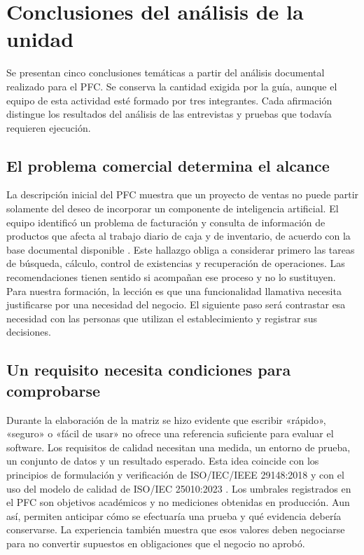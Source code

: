 \section{Conclusiones del análisis de la unidad}
Se presentan cinco conclusiones temáticas a partir del análisis documental realizado para el PFC. Se conserva la cantidad exigida por la guía, aunque el equipo de esta actividad esté formado por tres integrantes. Cada afirmación distingue los resultados del análisis de las entrevistas y pruebas que todavía requieren ejecución.

\subsection{El problema comercial determina el alcance}
La descripción inicial del PFC muestra que un proyecto de ventas no puede partir solamente del deseo de incorporar un componente de inteligencia artificial. El equipo identificó un problema de facturación y consulta de información de productos que afecta al trabajo diario de caja y de inventario, de acuerdo con la base documental disponible \cite{basePFC2026}. Este hallazgo obliga a considerar primero las tareas de búsqueda, cálculo, control de existencias y recuperación de operaciones. Las recomendaciones tienen sentido si acompañan ese proceso y no lo sustituyen. Para nuestra formación, la lección es que una funcionalidad llamativa necesita justificarse por una necesidad del negocio. El siguiente paso será contrastar esa necesidad con las personas que utilizan el establecimiento y registrar sus decisiones.

\subsection{Un requisito necesita condiciones para comprobarse}
Durante la elaboración de la matriz se hizo evidente que escribir «rápido», «seguro» o «fácil de usar» no ofrece una referencia suficiente para evaluar el software. Los requisitos de calidad necesitan una medida, un entorno de prueba, un conjunto de datos y un resultado esperado. Esta idea coincide con los principios de formulación y verificación de ISO/IEC/IEEE 29148:2018 y con el uso del modelo de calidad de ISO/IEC 25010:2023 \cite{iso29148,iso25010}. Los umbrales registrados en el PFC son objetivos académicos y no mediciones obtenidas en producción. Aun así, permiten anticipar cómo se efectuaría una prueba y qué evidencia debería conservarse. La experiencia también muestra que esos valores deben negociarse para no convertir supuestos en obligaciones que el negocio no aprobó.

